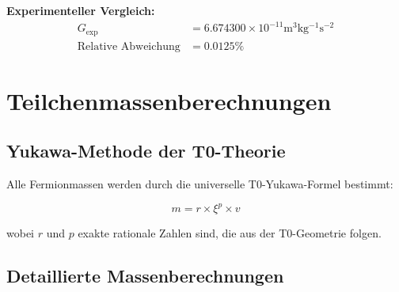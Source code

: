 	\textbf{Experimenteller Vergleich:}
	\begin{align}
		G_{\text{exp}} &= 6.674300 \times 10^{-11} \si{\meter^3 \kilogram^{-1} \second^{-2}} \\
		\text{Relative Abweichung} &= 0.0125\%
	\end{align}
	
	\section{Teilchenmassenberechnungen}
	
	\subsection{Yukawa-Methode der T0-Theorie}
	
	Alle Fermionmassen werden durch die universelle T0-Yukawa-Formel bestimmt:
	
	\begin{equation}
		\boxed{m = r \times \xi^p \times v}
	\end{equation}
	
	wobei $r$ und $p$ exakte rationale Zahlen sind, die aus der T0-Geometrie folgen.
	
	\subsection{Detaillierte Massenberechnungen}
	

